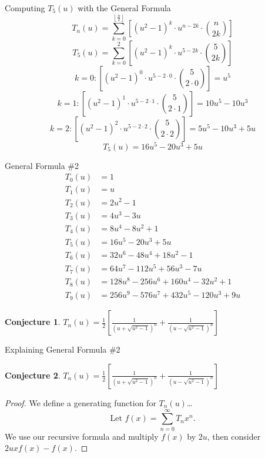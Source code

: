 \documentclass{beamer}
\newtheorem{conjecture}{Conjecture}
\begin{document}
\begin{frame}{Computing $T_5(u)$ with the General Formula}
 \vspace{-12pt}
 \[T_n(u) = \displaystyle\sum_{k=0}^{\left\lfloor \tfrac{n}{2} \right\rfloor} \left[(u^2-1)^k \cdot u^{n-2k} \cdot \binom{n}{2k}\right]\] \pause
 \[T_5(u) = \displaystyle\sum_{k=0}^{2} \left[(u^2-1)^k \cdot u^{5-2k} \cdot \binom{5}{2k}\right]\] \pause
 \[k=0 : \left[(u^2-1)^0 \cdot u^{5-2\cdot 0} \cdot \binom{5}{2\cdot 0}\right]=u^5\] \pause
 \[k=1 : \left[(u^2-1)^1 \cdot u^{5-2\cdot 1} \cdot \binom{5}{2\cdot 1}\right]=10u^5-10u^3\] \pause
 \[k=2 : \left[(u^2-1)^2 \cdot u^{5-2\cdot 2} \cdot \binom{5}{2\cdot 2}\right]=5u^5-10u^3+5u\] \pause
 \[T_5(u)=16u^5-20u^3+5u\]
\end{frame}

\begin{frame}{General Formula \#2}
 \vspace{-18pt}
 \tiny{}
 \begin{align*}
  T_0(u) & = 1                                      \\
  T_1(u) & = u                                      \\
  T_2(u) & = 2u^2 - 1                               \\
  T_3(u) & = 4u^3 - 3u                              \\
  T_4(u) & = 8u^4 - 8 u^2 + 1                       \\
  T_5(u) & = 16u^5 - 20u^3 + 5u                     \\
  T_6(u) & = 32u^6 - 48u^4 + 18u^2 - 1              \\
  T_7(u) & = 64u^7 - 112u^5 + 56u^3 - 7u            \\
  T_8(u) & = 128u^8 - 256u^6 + 160u^4 - 32u^2 + 1   \\
  T_9(u) & = 256u^9 - 576u^7 + 432u^5 - 120u^3 + 9u
 \end{align*} \normalsize
 \hline
 \vspace{12pt}
 \begin{conjecture}\center
  \vspace{-12pt}
  $T_{n}(u) = \frac{1}{2} \left[ \frac{1}{(u+\sqrt{u^{2}-1})^{n}} + \frac{1}{(u-\sqrt{u^{2}-1})^{n}} \right]$
 \end{conjecture}
\end{frame}

\begin{frame}{Explaining General Formula \#2}
 \begin{conjecture}\center
  \vspace{-12pt}
  $T_{n}(u) = \frac{1}{2} \left[ \frac{1}{(u+\sqrt{u^{2}-1})^{n}} + \frac{1}{(u-\sqrt{u^{2}-1})^{n}} \right]$ \\[12pt]
 \end{conjecture}
 \pause
 \begin{proof}
 We define a generating function for $T_n(u)$\dots
 \[\text{Let } f(x) = \displaystyle \sum_{n=0}^{\infty} T_{n}x^{n}.\]
 We use our recursive formula and multiply $f(x)$ by $2u$, then consider $2ux f(x) - f(x)$.
 \end{proof}
\end{frame}
\end{document}
